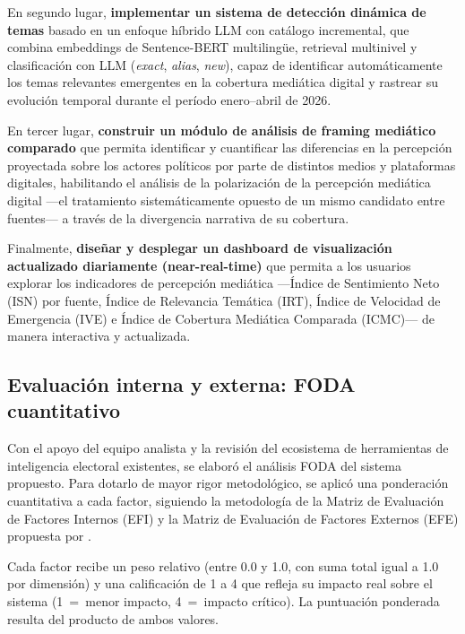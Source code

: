 En segundo lugar, \textbf{implementar un sistema de detección dinámica de temas} basado en un enfoque híbrido LLM con catálogo incremental, que combina embeddings de Sentence-BERT multilingüe, retrieval multinivel y clasificación con LLM (\textit{exact}, \textit{alias}, \textit{new}), capaz de identificar automáticamente los temas relevantes emergentes en la cobertura mediática digital y rastrear su evolución temporal durante el período enero–abril de 2026.

En tercer lugar, \textbf{construir un módulo de análisis de framing mediático comparado} que permita identificar y cuantificar las diferencias en la percepción proyectada sobre los actores políticos por parte de distintos medios y plataformas digitales, habilitando el análisis de la polarización de la percepción mediática digital —el tratamiento sistemáticamente opuesto de un mismo candidato entre fuentes— a través de la divergencia narrativa de su cobertura.

Finalmente, \textbf{diseñar y desplegar un dashboard de visualización actualizado diariamente (near-real-time)} que permita a los usuarios explorar los indicadores de percepción mediática —Índice de Sentimiento Neto (ISN) por fuente, Índice de Relevancia Temática (IRT), Índice de Velocidad de Emergencia (IVE) e Índice de Cobertura Mediática Comparada (ICMC)— de manera interactiva y actualizada.

\subsection{Evaluación interna y externa: FODA cuantitativo}

Con el apoyo del equipo analista y la revisión del ecosistema de herramientas de inteligencia electoral existentes, se elaboró el análisis FODA del sistema propuesto. Para dotarlo de mayor rigor metodológico, se aplicó una ponderación cuantitativa a cada factor, siguiendo la metodología de la Matriz de Evaluación de Factores Internos (EFI) y la Matriz de Evaluación de Factores Externos (EFE) propuesta por \textcite{david2013strategic}.

Cada factor recibe un peso relativo (entre 0.0 y 1.0, con suma total igual a 1.0 por dimensión) y una calificación de 1 a 4 que refleja su impacto real sobre el sistema (1~=~menor impacto, 4~=~impacto crítico). La puntuación ponderada resulta del producto de ambos valores.

